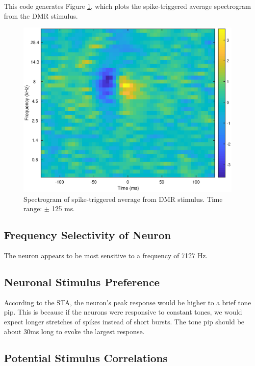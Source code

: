 \documentclass[11pt, oneside]{article}
\begin{document}
This code generates Figure \ref{fig:sta_spectro}, which plots the spike-triggered average spectrogram from the DMR stimulus.

\begin{figure}[ht!]
\includegraphics[width=1\textwidth]{sta_spectro.eps}
\caption{Spectrogram of spike-triggered average from DMR stimulus. Time range: $\pm$ 125 ms.}
\label{fig:sta_spectro}
\end{figure}

\subsection{Frequency Selectivity of Neuron}

The neuron appears to be most sensitive to a frequency of 7127 Hz.

\subsection{Neuronal Stimulus Preference}

According to the STA, the neuron's peak response would be higher to a brief tone pip. This is because if the neurons were responsive to constant tones, we would expect longer stretches of spikes instead of short bursts. The tone pip should be about 30ms long to evoke the largest response.

\subsection{Potential Stimulus Correlations}
\end{document}
